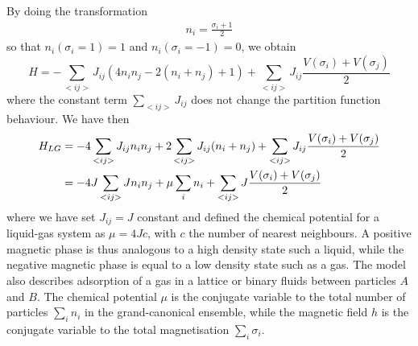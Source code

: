 By doing the transformation\cite{goldenfeld_lectures_2018} 
\begin{align}
    n_i =  \frac{\sigma_i +1}{2}
\end{align}
so that $n_i(\sigma_i = 1) = 1$ and $n_i(\sigma_i = -1) = 0$, we obtain
\begin{equation}
	H =  - \sum_{< i j >}  J_{ij} \left( 4 n_i n_j -2 ( n_i+n_j) + 1 \right)+ \sum_{< i j >}  J_{ij} \frac{V(\sigma_i)+V(\sigma_j)}{2}  
\end{equation}
where the constant term $\sum_{< i j >}  J_{ij}$ does not change the partition function behaviour. We have then
\begin{align}
	H_{LG} &=  - 4 \sum_{< i j >}  J_{ij}  n_i n_j  + 2 \sum_{< i j >}  J_{ij}  (n_i+n_j) + \sum_{< i j >}  J_{ij} \frac{V(\sigma_i)+V(\sigma_j)}{2}  \nonumber \\
       &=  - 4 J \sum_{< i j >}  J n_i n_j  + \mu \sum_i  n_i + \sum_{< i j >}  J \frac{V(\sigma_i)+V(\sigma_j)}{2}  
\end{align}
where we have set $J_{ij} = J$ constant and defined the chemical potential for a liquid-gas system as $\mu=4Jc$, with  $c$ the number of nearest neighbours. A positive magnetic phase is thus analogous to a high density state such a liquid, while the negative magnetic phase is equal to a low density state such as a gas. The model also describes adsorption of a gas in a lattice or binary fluids between particles $A$ and $B$.
The chemical potential $\mu$ is the conjugate variable to the total number of particles $\sum_i n_i$ in the grand-canonical ensemble, while the magnetic field $h$ is the conjugate variable to the total magnetisation $\sum_i \sigma_i$.



